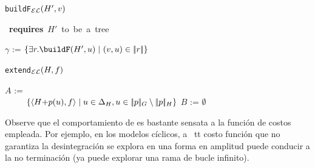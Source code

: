 %
\begin{center}\begin{minipage}{5cm}%
\begin{algorithm}[H] \small
{} \caption{\small
\texttt{buildF}$_\mathcal{EL}(H',v)$}\label{alg:build-form-el} \mbox{{\bf
requires} $H'$ to be a tree}

$\gamma$ := $\cset{\exists r.\buildF(H',u) \mid$

\hfill$ (v,u) \in \interp{r}}$\;

\;
\end{algorithm}
\end{minipage}
\begin{minipage}{7cm}%
\begin{algorithm}[H]\small
{} \caption{\small
\texttt{extend}$_\mathcal{EL}(H,f)$}\label{alg:extend-el}

$A$ :=\\
\ \ \ \ \  $\{\langle H {+} p(u),f \rangle \mid u \in \Delta_H, u \in
|\!|p|\!|_G \setminus |\!|p|\!|_H\}$\; $B$ := $\emptyset$\;
  \;
\end{algorithm}
\end{minipage}
\end{center}
%
Observe que el comportamiento de  es bastante sensata
a la función de costos empleada. Por ejemplo, en los modelos cíclicos,
a {\ tt} costo función que no garantiza la desintegración se explora en una
forma en amplitud puede conducir a la no terminación (ya
 puede explorar una rama de bucle infinito).



